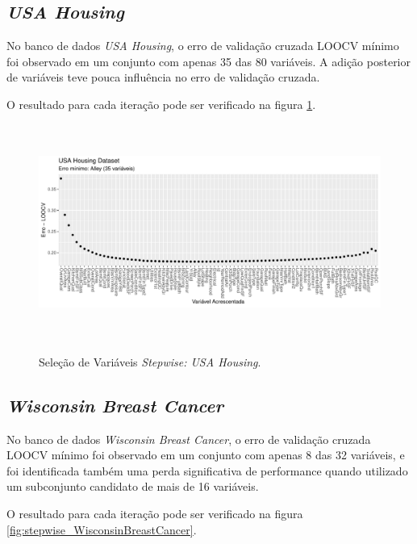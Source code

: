 \subsection{\textit{USA Housing}}
No banco de dados \textit{USA Housing}, o erro de validação cruzada LOOCV mínimo foi observado em um conjunto com apenas 35 das 80 variáveis. A adição posterior de variáveis teve pouca influência no erro de validação cruzada. 

O resultado para cada iteração pode ser verificado na figura \ref{fig:stepwise_USAHousingDataset_validation}.

\begin{figure}[!htb]
    \centering
    \caption{Seleção de Variáveis \textit{Stepwise: USA Housing}.}
    \includegraphics[height=200pt]{imgs/res/USAHousingDataset_validation.pdf}
    \label{fig:stepwise_USAHousingDataset_validation}
\end{figure}
\FloatBarrier

\subsection{\textit{Wisconsin Breast Cancer}}
No banco de dados \textit{Wisconsin Breast Cancer}, o erro de validação cruzada LOOCV mínimo foi observado em um conjunto com apenas 8 das 32 variáveis, e foi identificada também uma perda significativa de performance quando utilizado um subconjunto candidato de mais de 16 variáveis. 

O resultado para cada iteração pode ser verificado na figura \ref{fig:stepwise_WisconsinBreastCancer}.


